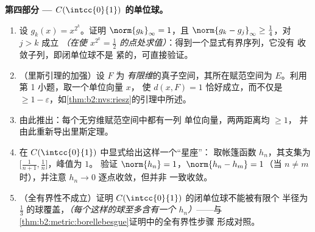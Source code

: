 \begin{problem}
\medskip
\noindent\textbf{第四部分 --- $C(\intcc{0}{1})$
的单位球。}
\begin{enumerate}[resume]
  \item 设 $g_k(x) = x^{2^k}$。证明 $\norm{g_k}_\infty = 1$，且
        $\norm{g_k - g_j}_\infty \geq \frac14$，对 $j > k$ 成立
        \emph{（在使 $x^{2^k} =
        \frac12$ 的点处求值）}：得到一个显式有界序列，它没有
        收敛子列，即闭单位球不是
        紧的，可直接验证。
  \item （里斯引理的加强）设 $F$ 为
        \emph{有限维}的真子空间，其所在赋范空间为
        $E$。利用第 1 小题，取一个单位向量 $x$，
        使 $d(x, F) = 1$ 恰好成立，而不仅是 $\geq 1 -
        \varepsilon$，如\cref{thm:b2:nvs:riesz}的引理中所述。
  \item 由此推出：每个无穷维赋范空间中都有一列
        单位向量，两两距离均 $\geq 1$，
        并由此重新导出里斯定理。
  \item 在 $C(\intcc{0}{1})$ 中显式给出这样一个“星座”：
        取帐篷函数 $h_n$，其支集为
        $\bigl[\frac1{n+1}, \frac1n\bigr]$，峰值为 $1$。
        验证 $\norm{h_n} = 1$，$\norm{h_n - h_m} = 1$（当 $n
        \neq m$ 时），并注意 $h_n \to 0$ 逐点收敛，但并非
        一致收敛。
  \item （全有界性不成立）证明
        $C(\intcc{0}{1})$ 的闭单位球不能被有限个
        半径为 $\frac13$ 的球覆盖，\emph{（每个这样的球至多含有一个
        $h_n$）}——与
        \cref{thm:b2:metric:borellebesgue}证明中的全有界性步骤
        形成对照。
\end{enumerate}


\end{problem}
